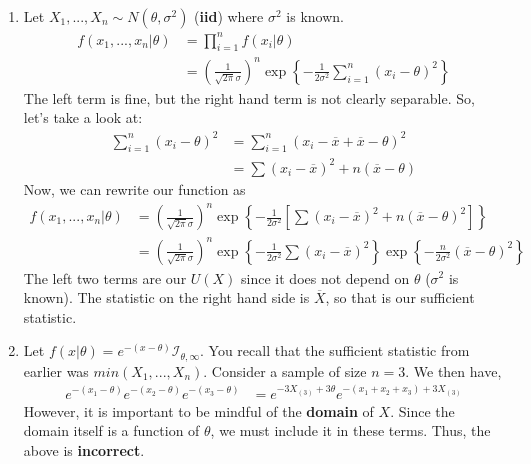 \documentclass{article}
\begin{document}
\begin{enumerate}
    \item Let $X_1,...,X_n \sim N(\theta,\sigma^2)$ (\textbf{iid}) where $\sigma^2$ is known.
    \begin{equation*}
        \begin{split}
            f(x_1,...,x_n|\theta) &= \prod_{i=1}^n f(x_i|\theta)\\
            &= \left(\frac{1}{\sqrt{2\pi}\sigma} \right)^n \exp\left\{-\frac{1}{2\sigma^2} \sum_{i=1}^n (x_i-\theta)^2 \right\}
        \end{split}
    \end{equation*}
    The left term is fine, but the right hand term is not clearly separable. So, let's take a look at:
    \begin{equation*}
        \begin{split}
            \sum_{i=1}^n (x_i-\theta)^2 &= \sum_{i=1}^n (x_i - \overline{x} + \overline{x} - \theta)^2\\
            &= \sum(x_i-\overline{x})^2 + n(\overline{x}-\theta)
        \end{split}
    \end{equation*}
    Now, we can rewrite our function as
    \begin{equation*}
        \begin{split}
            f(x_1,...,x_n|\theta) &= \left(\frac{1}{\sqrt{2\pi}\sigma} \right)^n
     \exp \left\{-\frac{1}{2\sigma^2}\left[\sum (x_i-\overline{x})^2 + n(\overline{x} - \theta)^2 \right]\right\}\\
     &= \left(\frac{1}{\sqrt{2\pi}\sigma} \right)^n
     \exp \left\{-\frac{1}{2\sigma^2} \sum (x_i-\overline{x})^2\right\}\exp\left\{ -\frac{n}{2\sigma^2}(\overline{x} - \theta)^2 \right\}
     \end{split}
    \end{equation*}
    The left two terms are our $U(X)$ since it does not depend on $\theta$ ($\sigma^2$ is known). The statistic on the right hand side is $\overline{X}$, so that is our sufficient statistic.

    \item Let $f(x|\theta) = e^{-(x-\theta)}\mathcal{I}_{\theta,\infty}$. You recall that the sufficient statistic from earlier was $min(X_1,...,X_n)$. Consider a sample of size $n=3$. We then have,
    \begin{equation*}
        \begin{split}
            e^{-(x_1-\theta)}e^{-(x_2-\theta)}e^{-(x_3-\theta)} &= e^{-3X_{(3)} + 3\theta}e^{-(x_1+x_2+x_3) + 3X_{(3)}}
        \end{split}
    \end{equation*}
    However, it is important to be mindful of the \textbf{domain} of $X$. Since the domain itself is a function of $\theta$, we must include it in these terms. Thus, the above is \textbf{incorrect}.


\end{enumerate}
\end{document}
